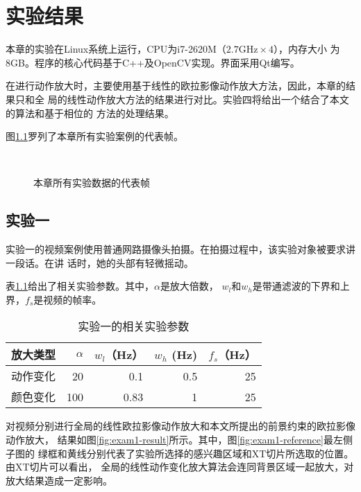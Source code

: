 \chapter{实验结果}
\label{chap:results}

本章的实验在Linux系统上运行，CPU为i7-2620M（$2.7\mbox{GHz}\times 4$），内存大小
为8GB。程序的核心代码基于C++及OpenCV实现。界面采用Qt编写。

在进行动作放大时，主要使用基于线性的欧拉影像动作放大方法，因此，本章的结果只和全
局的线性动作放大方法的结果进行对比。实验四将给出一个结合了本文的算法和基于相位的
方法的处理结果。

图\ref{fig:all-videos}罗列了本章所有实验案例的代表帧。

\begin{figure}[htbp]
  \centering
  \qquad
  \\
  \qquad
  \caption{本章所有实验数据的代表帧}
  \label{fig:all-videos}
\end{figure}

\section{实验一}
\label{sec:exam1}

实验一的视频案例使用普通网路摄像头拍摄。在拍摄过程中，该实验对象被要求讲一段话。在讲
话时，她的头部有轻微摇动。

表\ref{tab:exam1-data}给出了相关实验参数。其中，$\alpha$是放大倍数，
$w_l$和$w_h$是带通滤波的下界和上界，$f_s$是视频的帧率。

\begin{table}[htbp]
  \centering
  \caption{实验一的相关实验参数}
  \label{tab:exam1-data}
  \begin{tabular}[c]{crrrr}
    \toprule[1.5pt]
    放大类型 & $\alpha$ & $w_l$（Hz） & $w_h$ (Hz) & $f_s$（Hz）\\
    \midrule
    动作变化 & 20 & 0.1 & 0.5 & 25 \\
    颜色变化 & 100 & 0.83 & 1 & 25 \\
    \bottomrule[1.5pt]
  \end{tabular}
\end{table}

对视频分别进行全局的线性欧拉影像动作放大和本文所提出的前景约束的欧拉影像动作放大，
结果如图\ref{fig:exam1-result}所示。其中，图\ref{fig:exam1-reference}最左侧子图的
绿框和黄线分别代表了实验所选择的感兴趣区域和XT切片所选取的位置。由XT切片可以看出，
全局的线性动作变化放大算法会连同背景区域一起放大，对放大结果造成一定影响。

